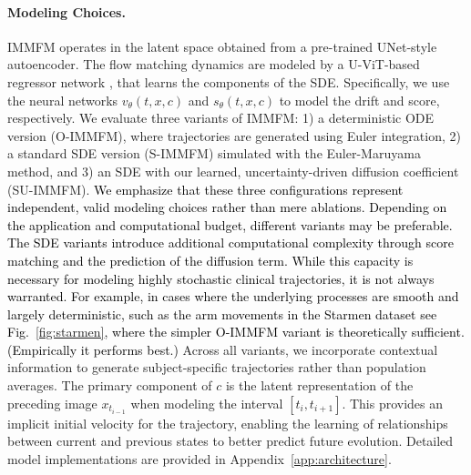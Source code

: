 \documentclass[twoside]{article}
\begin{document}
\paragraph{Modeling Choices.} IMMFM operates in the latent space obtained from a pre-trained UNet-style autoencoder. The flow matching dynamics are modeled by a U-ViT-based regressor network \citep{davtyan2023efficient}, that learns the components of the SDE. Specifically, we use the neural networks $v_{\theta}(t,x,c)$ and $s_{\theta}(t,x,c)$ to model the drift and score, respectively. We evaluate three variants of IMMFM: 1) a deterministic ODE version (O-IMMFM), where trajectories are generated using Euler integration, 2) a standard SDE version (S-IMMFM) simulated with the Euler-Maruyama method, and 3) an SDE with our learned, uncertainty-driven diffusion coefficient (SU-IMMFM). \textcolor{black}{ We emphasize that these three configurations represent independent, valid modeling choices rather than mere ablations. Depending on the application and computational budget, different variants may be preferable. The SDE variants introduce additional computational complexity through score matching and the prediction of the diffusion term. While this capacity is necessary for modeling highly stochastic clinical trajectories, it is not always warranted. For example, in cases where the underlying processes are smooth and largely deterministic, such as the arm movements in the Starmen dataset see Fig.~\ref{fig:starmen}, where the simpler O-IMMFM variant is theoretically sufficient. (Empirically it performs best.)} Across all variants, we incorporate contextual information to generate subject-specific trajectories rather than population averages. The primary component of $c$ is the latent representation of the preceding image $x_{t_{i-1}}$ when modeling the interval $[t_i, t_{i+1}]$. This provides an implicit initial velocity for the trajectory, enabling the learning of relationships between current and previous states to better predict future evolution. Detailed model implementations are provided in Appendix~\ref{app:architecture}.
\end{document}
